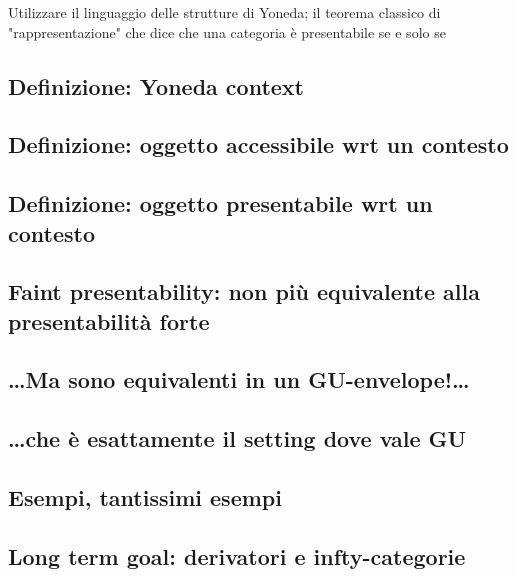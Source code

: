 \documentclass[11pt]{article}
\theoremstyle{reference}
\begin{document}
Utilizzare il linguaggio delle strutture di Yoneda; il teorema classico di "rappresentazione" che dice che una categoria è presentabile se e solo se 

\subsection{Definizione: Yoneda context}
\label{sec:orgb4a6cc9}
\subsection{Definizione: oggetto accessibile wrt un contesto}
\label{sec:org4f56f29}
\subsection{Definizione: oggetto presentabile wrt un contesto}
\label{sec:org15c0a19}
\subsection{Faint presentability: non più equivalente alla presentabilità forte}
\label{sec:orgaeee656}
\subsection{\ldots{}Ma sono equivalenti in un GU-envelope!\ldots{}}
\label{sec:orgf5c84f1}
\subsection{\ldots{}che è esattamente il setting dove vale GU}
\label{sec:org3ef6adb}
\subsection{Esempi, tantissimi esempi}
\label{sec:org6b79e8f}
\subsection{Long term goal: derivatori e infty-categorie}
\label{sec:org701e285}
\end{document}
